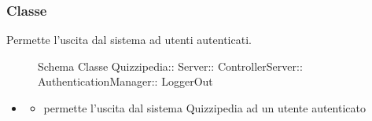 \subsubsection{Classe }
Permette l'uscita dal sistema ad utenti autenticati.
\begin{figure}[H]
\centering
\noindent{}
\caption[Schema Classe LoggerOut]{Schema Classe Quizzipedia:: Server:: ControllerServer:: AuthenticationManager:: LoggerOut}
\end{figure}
\begin{itemize}
\item {}
\begin{itemize}
\item {}
\newline
permette l'uscita dal sistema Quizzipedia ad un utente autenticato
\newline
\end{itemize}
\end{itemize}
